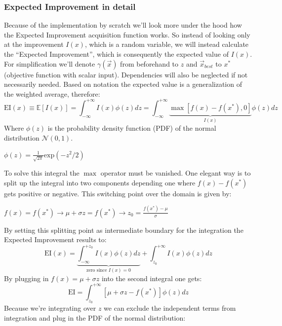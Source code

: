 \documentclass[12pt, a4paper]{article}
\begin{document}
\subsubsection{Expected Improvement in detail}
Because of the implementation by scratch we'll look more under the hood how the Expected Improvement acquisition function works. So instead of looking only at the improvement $I(x)$, which is a random variable, we will instead calculate the ``Expected Improvement'', which is consequently the expected value of $I(x)$.
For simplification we'll denote $\gamma(\vec{x})$ from beforehand to $z$ and $\vec{x}_{best}$ to $x^{\ast}$ (objective function with scalar input). Dependencies will also be neglected if not necessarily needed.
Based on notation the expected value is a generalization of the weighted average, therefore:
\begin{equation}
    \text{EI}(x) \equiv \mathbb{E}[I(x)] = \int_{- \infty}^{+ \infty} I(x) \phi(z) dz =
    \int_{- \infty}^{+ \infty} \underbrace{ {\max}[f(x) - f(x^{\ast}),0] }_{I(x)} \phi(z) dz
\end{equation}
Where $\phi(z)$ is the probability density function (PDF) of the normal distribution $\mathcal{N}(0,1)$.
\begin{center}
    $\phi(z) = \frac{1}{\sqrt{2\pi}} \text{exp}(-z^2/2)$
\end{center}
To solve this integral the $\max$ operator must be vanished. One elegant way is to split up the integral into two components depending one where $f(x) - f(x^{\ast})$ gets positive or negative. This switching point over the domain is given by:
\begin{center}
    $f(x) = f(x^{\ast}) \rightarrow \mu + \sigma z = f(x^{\ast}) \rightarrow z_0 = \frac{f(x^{\ast}) - \mu}{\sigma}$
\end{center}
By setting this splitting point as intermediate boundary for the integration the Expected Improvement results to:
\begin{equation}
    \text{EI}(x) = \underbrace{\int_{- \infty}^{+ z_0} I(x) \phi(z) dz}_{\text{zero since }  I(x) = 0} + \int_{z_0}^{+ \infty} I(x) \phi(z) dz
\end{equation}
By plugging in $f(x) = \mu + \sigma z$ into the second integral one gets:
\begin{equation}
    \text{EI} = \int_{z_0}^{+ \infty} [\mu + \sigma z - f(x^{\ast})] \phi(z) dz
\end{equation}
Because we're integrating over $z$ we can exclude the independent terms from integration and plug in the PDF of the normal distribution:
\end{document}
